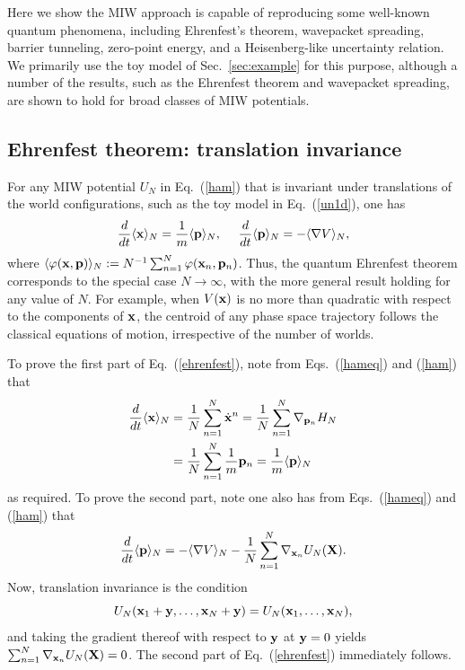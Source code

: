 \documentclass[twocolumn,aps,pra,amsmath,amssymb,superscriptaddress]{revtex4}
\newcommand{\beq}{\begin{equation}}
\newcommand{\eeq}{\end{equation}}
\renewcommand{\(}{\left(}
\renewcommand{\)}{\right)}
\newcommand{\blk}{\color{black}}
\newcommand{\blu}{\color{blue}}
\renewcommand\blu{\blk}
\begin{document}
Here we show the MIW approach is capable of reproducing some  well-known
quantum phenomena, including Ehrenfest's theorem, wavepacket spreading, barrier
tunneling, zero-point energy, and a Heisenberg-like uncertainty relation. We primarily use the toy model of Sec.~\ref{sec:example} for this purpose, although a number of the results, such as the Ehrenfest theorem and wavepacket spreading, are shown to hold for broad classes of MIW potentials. 

\subsection{Ehrenfest theorem: translation invariance}

For any MIW potential $U_N$ in Eq.~(\ref{ham}) that is invariant under translations of the world configurations, such as the toy model in Eq.~(\ref{un1d}), one has
\begin{equation} \label{ehrenfest}
\frac{d}{dt}\langle {\bf x}\rangle_N = \frac{1}{m}\langle {\bf p} \rangle_N,~~~~\frac{d}{dt}\langle {\bf p}\rangle_N = -\langle \nabla V\rangle_N,
\end{equation}
 where $\langle {\varphi}({\bf x},{\bf p}) \rangle_N:= N^{-1}\sum_{n=1}^N
 {\varphi}({\bf x}_n,{\bf p}_n)$.  Thus, the quantum Ehrenfest theorem 
 corresponds to \blk the special case $N\rightarrow\infty$, with the more
 general result holding for any value of $N$.  For example, when $V({\bf x})$ is
 no more than quadratic  with respect to the components of ${\bf x}$, the
 centroid of any phase space trajectory follows the classical equations of
 motion, irrespective of the number of worlds.

To prove the first part of Eq.~(\ref{ehrenfest}), note  from Eqs.~(\ref{hameq}) and (\ref{ham}) that
\begin{align*}
\frac{d}{dt}\langle {\bf x}\rangle_N &= \frac{1}{N} \sum_{n=1}^N \dot{{\bf x}}^n = \blu \frac{1}{N} \sum_{n=1}^N \nabla_{{\bf p}_n} H_N \blk \\
&= \frac{1}{N} \sum_{n=1}^N \frac{1}{m} {\bf p}_n = \frac{1}{m}\langle {\bf p} \rangle_N
\end{align*}
as required.  To prove the second part, note one also has from Eqs.~(\ref{hameq}) and (\ref{ham}) that
\[ \frac{d}{dt}\langle {\bf p}\rangle_N = -\langle \nabla V\rangle_N -\frac{1}{N}\sum_{n=1}^N \nabla_{{\bf x}_n} U_N({\bf X}). \]
Now, translation invariance is the condition 
\beq 
U_N({\bf x}_1+{\bf y},\dots,{\bf
x}_N+{\bf y})=U_N({\bf x}_1,\dots,{\bf x}_N), 
\eeq
\blk and taking the gradient thereof
with respect to ${\bf y}$ at ${\bf y}=0$  yields  $\sum_{n=1}^N
\nabla_{{\bf x}_n} U_N({\bf X})=0$.  The second part of Eq.~(\ref{ehrenfest})
immediately follows.
\end{document}
